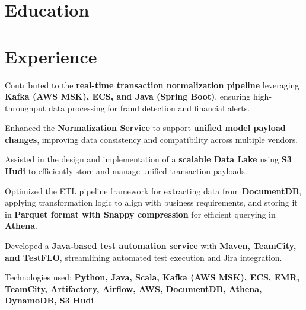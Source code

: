 \documentclass[letterpaper,10pt]{article}
\begin{document}

\section{Education}

\section{Experience}

\begin{resume_list}
    \vspace{5pt}
    \item Contributed to the \textbf{real-time transaction normalization pipeline} leveraging \textbf{Kafka (AWS MSK), ECS, and Java (Spring Boot)}, ensuring high-throughput data processing for fraud detection and financial alerts.
    \item Enhanced the \textbf{Normalization Service} to support \textbf{unified model payload changes}, improving data consistency and compatibility across multiple vendors.
    \item Assisted in the design and implementation of a \textbf{scalable Data Lake} using \textbf{S3 Hudi} to efficiently store and manage unified transaction payloads.
    \item Optimized the ETL pipeline framework for extracting data from \textbf{DocumentDB}, applying transformation logic to align with business requirements, and storing it in \textbf{Parquet format with Snappy compression} for efficient querying in \textbf{Athena}.
    \item Developed a \textbf{Java-based test automation service} with \textbf{Maven, TeamCity, and TestFLO}, streamlining automated test execution and Jira integration.
    \item Technologies used: \textbf{Python, Java, Scala, Kafka (AWS MSK), ECS, EMR, TeamCity, Artifactory, Airflow, AWS, DocumentDB, Athena, DynamoDB, S3 Hudi}
\end{resume_list}
\end{document}
